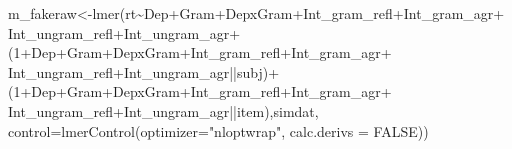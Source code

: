 \documentclass[
  12pt,
]{krantz}
\newenvironment{Shaded}{\begin{snugshade}}{\end{snugshade}}
\newcommand{\AttributeTok}[1]{\textcolor[rgb]{0.77,0.63,0.00}{#1}}
\newcommand{\ConstantTok}[1]{\textcolor[rgb]{0.00,0.00,0.00}{#1}}
\newcommand{\DecValTok}[1]{\textcolor[rgb]{0.00,0.00,0.81}{#1}}
\newcommand{\FunctionTok}[1]{\textcolor[rgb]{0.00,0.00,0.00}{#1}}
\newcommand{\NormalTok}[1]{#1}
\newcommand{\OtherTok}[1]{\textcolor[rgb]{0.56,0.35,0.01}{#1}}
\newcommand{\SpecialCharTok}[1]{\textcolor[rgb]{0.00,0.00,0.00}{#1}}
\newcommand{\StringTok}[1]{\textcolor[rgb]{0.31,0.60,0.02}{#1}}
\theoremstyle{definition}
\theoremstyle{definition}
\theoremstyle{definition}
\theoremstyle{definition}
\theoremstyle{remark}
\begin{document}
\begin{Shaded}
\begin{Highlighting}[]
\NormalTok{    m\_fakeraw}\OtherTok{\textless{}{-}}\FunctionTok{lmer}\NormalTok{(rt}\SpecialCharTok{\textasciitilde{}}\NormalTok{Dep}\SpecialCharTok{+}\NormalTok{Gram}\SpecialCharTok{+}\NormalTok{DepxGram}\SpecialCharTok{+}\NormalTok{Int\_gram\_refl}\SpecialCharTok{+}\NormalTok{Int\_gram\_agr}\SpecialCharTok{+}
\NormalTok{                 Int\_ungram\_refl}\SpecialCharTok{+}\NormalTok{Int\_ungram\_agr}\SpecialCharTok{+}
\NormalTok{                 (}\DecValTok{1}\SpecialCharTok{+}\NormalTok{Dep}\SpecialCharTok{+}\NormalTok{Gram}\SpecialCharTok{+}\NormalTok{DepxGram}\SpecialCharTok{+}\NormalTok{Int\_gram\_refl}\SpecialCharTok{+}\NormalTok{Int\_gram\_agr}\SpecialCharTok{+}
\NormalTok{                    Int\_ungram\_refl}\SpecialCharTok{+}\NormalTok{Int\_ungram\_agr}\SpecialCharTok{||}\NormalTok{subj)}\SpecialCharTok{+}
\NormalTok{                 (}\DecValTok{1}\SpecialCharTok{+}\NormalTok{Dep}\SpecialCharTok{+}\NormalTok{Gram}\SpecialCharTok{+}\NormalTok{DepxGram}\SpecialCharTok{+}\NormalTok{Int\_gram\_refl}\SpecialCharTok{+}\NormalTok{Int\_gram\_agr}\SpecialCharTok{+}
\NormalTok{                    Int\_ungram\_refl}\SpecialCharTok{+}\NormalTok{Int\_ungram\_agr}\SpecialCharTok{||}\NormalTok{item),simdat,}
               \AttributeTok{control=}\FunctionTok{lmerControl}\NormalTok{(}\AttributeTok{optimizer=}\StringTok{"nloptwrap"}\NormalTok{, }
                                   \AttributeTok{calc.derivs =} \ConstantTok{FALSE}\NormalTok{))}


\end{Highlighting}
\end{Shaded}
\end{document}
